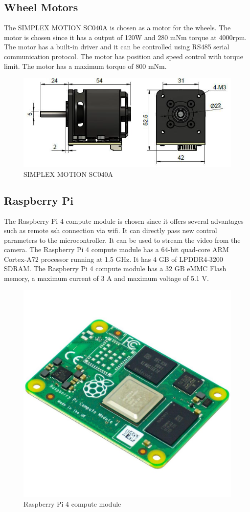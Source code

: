 \subsection{Wheel Motors}
The SIMPLEX MOTION SC040A is chosen as a motor for the wheels. The motor is chosen since it has a output of 120W and 280 mNm torque at 4000rpm. The motor has a built-in driver and it can be controlled using RS485 serial communication protocol. The motor has  position and speed control with torque limit. The motor has a maximum torque of 800 mNm.
\begin{figure}[h]
	\centering
	\includegraphics[width=0.5\linewidth]{SIMPLEX_MOTION_SC040A}
	\caption[SIMPLEX MOTION SC040A]{SIMPLEX MOTION SC040A}
	\label{fig:SIMPLEX_MOTION_SC040A}
\end{figure}



\subsection{Raspberry Pi}
The Raspberry Pi 4 compute module is chosen since it offers several advantages such as remote ssh connection via wifi. It can directly pass new control parameters to the microcontroller. It can be used to stream the video from the camera. The Raspberry Pi 4 compute module has a 64-bit quad-core ARM Cortex-A72 processor running at 1.5 GHz. It has 4 GB of LPDDR4-3200 SDRAM. The Raspberry Pi 4 compute module has a 32 GB eMMC Flash memory, a maximum current of 3 A and maximum voltage of 5.1 V.

\begin{figure}[h]
	\centering
	\includegraphics[width=0.5\linewidth]{Raspberry_Pi_4_compute_module}
	\caption[Raspberry Pi 4 compute module]{Raspberry Pi 4 compute module}
	\label{fig:Raspberry_Pi_4}
\end{figure}
\newpage
